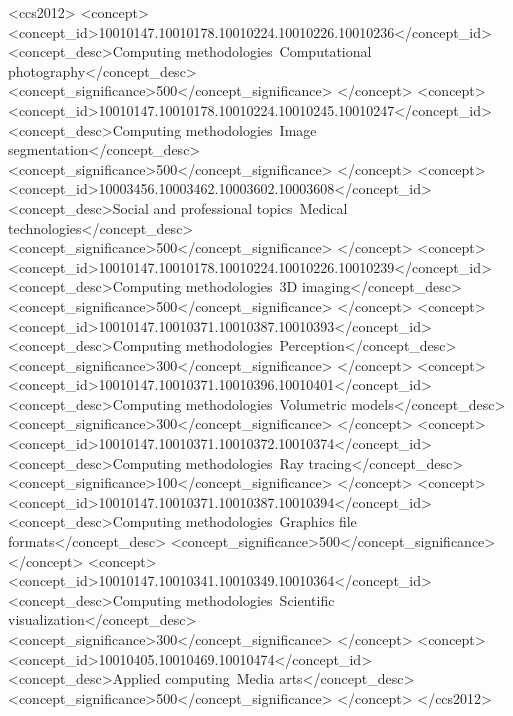 \documentclass[acmlarge,screen]{acmart}
\begin{document}
%
%
\begin{CCSXML}
<ccs2012>
<concept>
<concept_id>10010147.10010178.10010224.10010226.10010236</concept_id>
<concept_desc>Computing methodologies~Computational photography</concept_desc>
<concept_significance>500</concept_significance>
</concept>
<concept>
<concept_id>10010147.10010178.10010224.10010245.10010247</concept_id>
<concept_desc>Computing methodologies~Image segmentation</concept_desc>
<concept_significance>500</concept_significance>
</concept>
<concept>
<concept_id>10003456.10003462.10003602.10003608</concept_id>
<concept_desc>Social and professional topics~Medical technologies</concept_desc>
<concept_significance>500</concept_significance>
</concept>
<concept>
<concept_id>10010147.10010178.10010224.10010226.10010239</concept_id>
<concept_desc>Computing methodologies~3D imaging</concept_desc>
<concept_significance>500</concept_significance>
</concept>
<concept>
<concept_id>10010147.10010371.10010387.10010393</concept_id>
<concept_desc>Computing methodologies~Perception</concept_desc>
<concept_significance>300</concept_significance>
</concept>
<concept>
<concept_id>10010147.10010371.10010396.10010401</concept_id>
<concept_desc>Computing methodologies~Volumetric models</concept_desc>
<concept_significance>300</concept_significance>
</concept>
<concept>
<concept_id>10010147.10010371.10010372.10010374</concept_id>
<concept_desc>Computing methodologies~Ray tracing</concept_desc>
<concept_significance>100</concept_significance>
</concept>
<concept>
<concept_id>10010147.10010371.10010387.10010394</concept_id>
<concept_desc>Computing methodologies~Graphics file formats</concept_desc>
<concept_significance>500</concept_significance>
</concept>
<concept>
<concept_id>10010147.10010341.10010349.10010364</concept_id>
<concept_desc>Computing methodologies~Scientific visualization</concept_desc>
<concept_significance>300</concept_significance>
</concept>
<concept>
<concept_id>10010405.10010469.10010474</concept_id>
<concept_desc>Applied computing~Media arts</concept_desc>
<concept_significance>500</concept_significance>
</concept>
</ccs2012>
\end{CCSXML}

\end{document}
